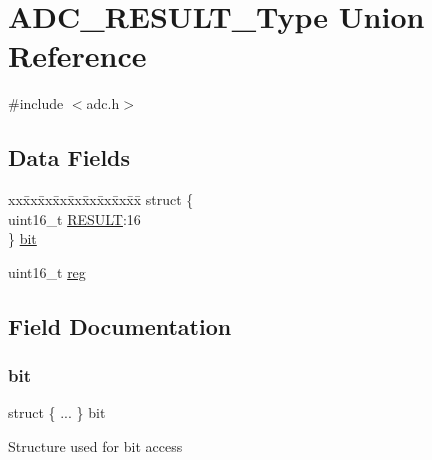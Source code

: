 \hypertarget{union_a_d_c___r_e_s_u_l_t___type}{}\section{A\+D\+C\+\_\+\+R\+E\+S\+U\+L\+T\+\_\+\+Type Union Reference}
\label{union_a_d_c___r_e_s_u_l_t___type}


{\ttfamily \#include $<$adc.\+h$>$}

\subsection*{Data Fields}
\begin{DoxyCompactItemize}
\item 
\begin{tabbing}
xx\=xx\=xx\=xx\=xx\=xx\=xx\=xx\=xx\=\kill
struct \{\\
\>uint16\_t \mbox{\hyperlink{union_a_d_c___r_e_s_u_l_t___type_aa81d50f7080d10e9dce5e97adcd3ac8b}{RESULT}}:16\\
\} \mbox{\hyperlink{union_a_d_c___r_e_s_u_l_t___type_ab865be3dab32f7a905520431478c8103}{bit}}\\

\end{tabbing}\item 
uint16\+\_\+t \mbox{\hyperlink{union_a_d_c___r_e_s_u_l_t___type_a11760f5020019f4aa8cb02e694f7cc44}{reg}}
\end{DoxyCompactItemize}


\subsection{Field Documentation}
\mbox{\label{union_a_d_c___r_e_s_u_l_t___type_ab865be3dab32f7a905520431478c8103}} 
\subsubsection{\texorpdfstring{bit}{bit}}
{\footnotesize\ttfamily struct \{ ... \}   bit}

Structure used for bit access \mbox{\label{union_a_d_c___r_e_s_u_l_t___type_a11760f5020019f4aa8cb02e694f7cc44}} 
